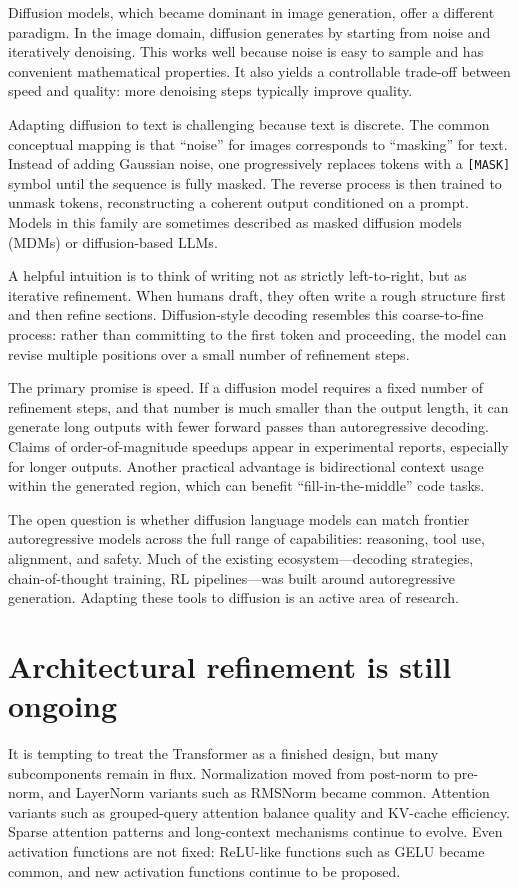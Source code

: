 Diffusion models, which became dominant in image generation, offer a different paradigm. In the image domain, diffusion generates by starting from noise and iteratively denoising. This works well because noise is easy to sample and has convenient mathematical properties. It also yields a controllable trade-off between speed and quality: more denoising steps typically improve quality.

Adapting diffusion to text is challenging because text is discrete. The common conceptual mapping is that “noise” for images corresponds to “masking” for text. Instead of adding Gaussian noise, one progressively replaces tokens with a \texttt{[MASK]} symbol until the sequence is fully masked. The reverse process is then trained to unmask tokens, reconstructing a coherent output conditioned on a prompt. Models in this family are sometimes described as masked diffusion models (MDMs) or diffusion-based LLMs.

A helpful intuition is to think of writing not as strictly left-to-right, but as iterative refinement. When humans draft, they often write a rough structure first and then refine sections. Diffusion-style decoding resembles this coarse-to-fine process: rather than committing to the first token and proceeding, the model can revise multiple positions over a small number of refinement steps.

The primary promise is speed. If a diffusion model requires a fixed number of refinement steps, and that number is much smaller than the output length, it can generate long outputs with fewer forward passes than autoregressive decoding. Claims of order-of-magnitude speedups appear in experimental reports, especially for longer outputs. Another practical advantage is bidirectional context usage within the generated region, which can benefit “fill-in-the-middle” code tasks.

The open question is whether diffusion language models can match frontier autoregressive models across the full range of capabilities: reasoning, tool use, alignment, and safety. Much of the existing ecosystem—decoding strategies, chain-of-thought training, RL pipelines—was built around autoregressive generation. Adapting these tools to diffusion is an active area of research.

\section{Architectural refinement is still ongoing}
It is tempting to treat the Transformer as a finished design, but many subcomponents remain in flux. Normalization moved from post-norm to pre-norm, and LayerNorm variants such as RMSNorm became common. Attention variants such as grouped-query attention balance quality and KV-cache efficiency. Sparse attention patterns and long-context mechanisms continue to evolve. Even activation functions are not fixed: ReLU-like functions such as GELU became common, and new activation functions continue to be proposed.

